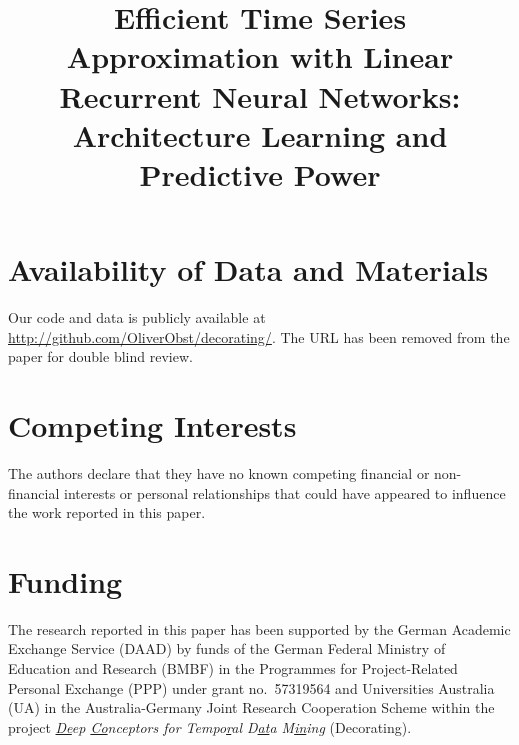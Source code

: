 \documentclass[sn-mathphys-num]{sn-jnl}
\begin{document}
\title{Efficient Time Series Approximation with Linear Recurrent Neural Networks: Architecture Learning and Predictive Power}

\author*[1]{ }
\author[1]{ }
\author[2]{ }
\author[2]{ }



\maketitle

\section*{Availability of Data and Materials}
Our code and data is publicly available at
\href{http://github.com/OliverObst/decorating/}{http://github.com/OliverObst/decorating/}.
The URL has been removed from the paper for double blind review.

\section*{Competing Interests}
The authors declare that they have no known competing financial or non-financial
interests or personal relationships that could have appeared to influence the
work reported in this paper.

\section*{Funding}
The research reported in this paper has been supported by the
German Academic Exchange Service (DAAD) by funds of the German Federal Ministry
of Education and Research (BMBF) in the Programmes for Project-Related Personal
Exchange (PPP) under grant no.~57319564 and Universities Australia (UA) in the
Australia-Germany Joint Research Cooperation Scheme within the project
\emph{\underline{De}ep \underline{Co}nceptors for Tempo\underline{r}al
D\underline{at}a M\underline{in}in\underline{g}} (Decorating).
\end{document}
